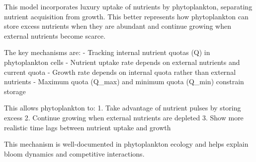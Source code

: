 This model incorporates luxury uptake of nutrients by phytoplankton, separating nutrient acquisition from growth. This better represents how phytoplankton can store excess nutrients when they are abundant and continue growing when external nutrients become scarce.

The key mechanisms are:
- Tracking internal nutrient quotas (Q) in phytoplankton cells
- Nutrient uptake rate depends on external nutrients and current quota
- Growth rate depends on internal quota rather than external nutrients
- Maximum quota (Q_max) and minimum quota (Q_min) constrain storage

This allows phytoplankton to:
1. Take advantage of nutrient pulses by storing excess
2. Continue growing when external nutrients are depleted
3. Show more realistic time lags between nutrient uptake and growth

This mechanism is well-documented in phytoplankton ecology and helps explain bloom dynamics and competitive interactions.
